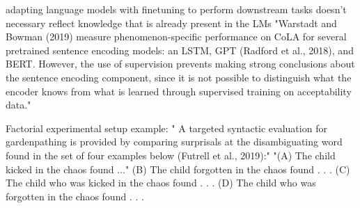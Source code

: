 adapting language models with finetuning to perform downstream tasks doesn’t necessary reflect knowledge that is already present in the LMs  \citep{warstadt2020blimp}
"Warstadt and Bowman (2019) measure phenomenon-specific performance on
CoLA for several pretrained sentence encoding
models: an LSTM, GPT (Radford et al., 2018),
and BERT. However, the use of supervision
prevents making strong conclusions about the
sentence encoding component, since it is not
possible to distinguish what the encoder knows
from what is learned through supervised training
on acceptability data." \citep{warstadt2020blimp}





Factorial experimental setup example:
" A targeted syntactic evaluation for gardenpathing is provided by comparing surprisals at the disambiguating word found in the set of four examples below (Futrell et al., 2019):"\citep{hu2020systematic}
"(A) The child kicked in the chaos found ..."
(B) The child forgotten in the chaos found . . .
(C) The child who was kicked in the chaos found . . .
(D) The child who was forgotten in the chaos found . . .


